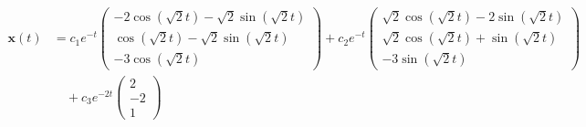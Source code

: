 \begin{questions}
\begin{solution}
\begin{align*}
        \boldsymbol{x}(t) &= c_1e^{-t} \begin{pmatrix} -2\cos(\sqrt{2}t) - \sqrt{2}\sin(\sqrt{2}t) \\ \cos(\sqrt{2}t) - \sqrt{2}\sin(\sqrt{2}t) \\ -3\cos(\sqrt{2}t) \end{pmatrix} + c_2e^{-t} \begin{pmatrix} \sqrt{2}\cos(\sqrt{2}t) - 2\sin(\sqrt{2}t) \\ \sqrt{2}\cos(\sqrt{2}t) + \sin(\sqrt{2}t) \\ -3\sin(\sqrt{2}t) \end{pmatrix} \\
        &\quad + c_3e^{-2t} \begin{pmatrix} 2 \\ -2 \\ 1 \end{pmatrix}
        \end{align*}
    \end{solution}


\end{questions}
